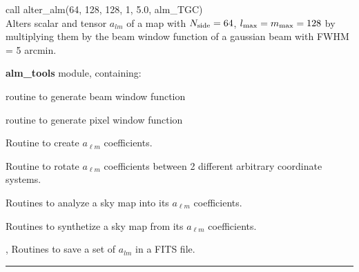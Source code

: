 \begin{example}
{
call alter\_alm(64, 128, 128, 1, 5.0, alm\_TGC)  \\
}
{
Alters scalar and tensor $a_{lm}$ of a map with $N_\mathrm{side}=64$, 
 $l_{\mathrm{max}}=m_{\mathrm{max}} = 128$ by multiplying them by the beam window function of a
gaussian beam with FWHM = 5 arcmin.
}
\end{example}

\begin{modules}
  \begin{sulist}{} %
  \item[\textbf{alm\_tools}] module, containing:
	\item[\htmlref{generate\_beam}{sub:generate_beam}] routine to generate beam window function
	\item[\htmlref{pixel\_window}{sub:pixel_window}] routine to generate pixel window function
  \end{sulist}
\end{modules}

\begin{related}
  \begin{sulist}{} %
  \item[\htmlref{create\_alm}{sub:create_alm}] Routine to create $a_{\ell m}$ coefficients.
  \item[\htmlref{rotate\_alm}{sub:rotate_alm}] Routine to rotate $a_{\ell m}$
  coefficients between 2 different arbitrary coordinate systems.
  \item[\htmlref{map2alm}{sub:map2alm}]  Routines to analyze a \healpix sky map into its $a_{\ell m}$
  coefficients.
  \item[\htmlref{alm2map}{sub:alm2map}] Routines to synthetize a \healpix sky map from its $a_{\ell m}$
  coefficients.
  \item[\htmlref{alms2fits}{sub:alms2fits}, \htmlref{dump\_alms}{sub:dump_alms}]
  Routines to save a set of $a_{lm}$ in a FITS file.  
  \end{sulist}
\end{related}

\rule{\hsize}{2mm}

\newpage
